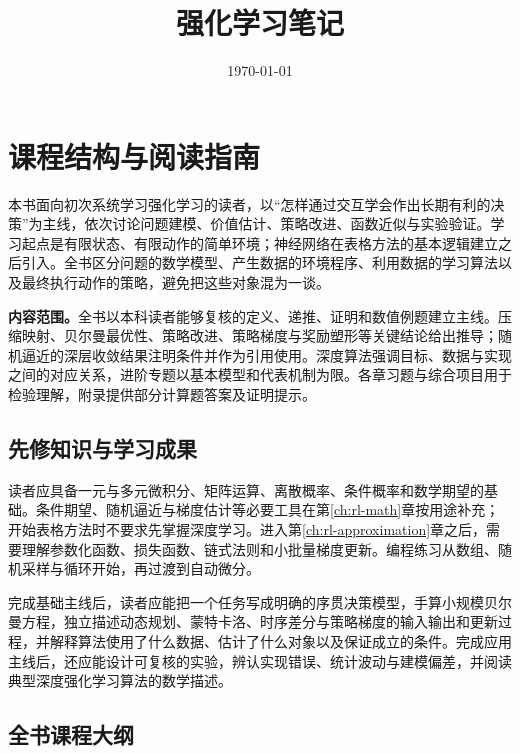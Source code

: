 \documentclass[UTF8,12pt,a4paper,fontset=fandol]{ctexbook}
\title{强化学习笔记}
\author{}
\date{\today}
\begin{document}
\maketitle
\tableofcontents
\clearpage


\chapter*{课程结构与阅读指南}

本书面向初次系统学习强化学习的读者，以“怎样通过交互学会作出长期有利的决策”为主线，依次讨论问题建模、价值估计、策略改进、函数近似与实验验证。学习起点是有限状态、有限动作的简单环境；神经网络在表格方法的基本逻辑建立之后引入。全书区分问题的数学模型、产生数据的环境程序、利用数据的学习算法以及最终执行动作的策略，避免把这些对象混为一谈。

\textbf{内容范围。}全书以本科读者能够复核的定义、递推、证明和数值例题建立主线。压缩映射、贝尔曼最优性、策略改进、策略梯度与奖励塑形等关键结论给出推导；随机逼近的深层收敛结果注明条件并作为引用使用。深度算法强调目标、数据与实现之间的对应关系，进阶专题以基本模型和代表机制为限。各章习题与综合项目用于检验理解，附录提供部分计算题答案及证明提示。

\section*{先修知识与学习成果}

读者应具备一元与多元微积分、矩阵运算、离散概率、条件概率和数学期望的基础。条件期望、随机逼近与梯度估计等必要工具在第\ref{ch:rl-math}章按用途补充；开始表格方法时不要求先掌握深度学习。进入第\ref{ch:rl-approximation}章之后，需要理解参数化函数、损失函数、链式法则和小批量梯度更新。编程练习从数组、随机采样与循环开始，再过渡到自动微分。

完成基础主线后，读者应能把一个任务写成明确的序贯决策模型，手算小规模贝尔曼方程，独立描述动态规划、蒙特卡洛、时序差分与策略梯度的输入输出和更新过程，并解释算法使用了什么数据、估计了什么对象以及保证成立的条件。完成应用主线后，还应能设计可复核的实验，辨认实现错误、统计波动与建模偏差，并阅读典型深度强化学习算法的数学描述。

\section*{全书课程大纲}
\end{document}
